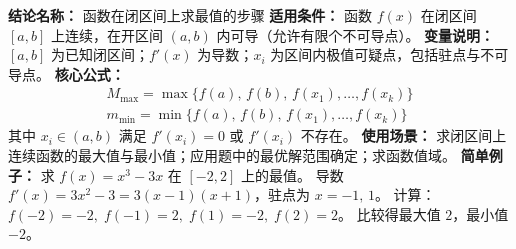 \textbf{结论名称：} 函数在闭区间上求最值的步骤  
\textbf{适用条件：} 函数 \( f(x) \) 在闭区间 \([a,b]\) 上连续，在开区间 \((a,b)\) 内可导（允许有限个不可导点）。  
\textbf{变量说明：} \( [a,b] \) 为已知闭区间；\( f'(x) \) 为导数；\( x_i \) 为区间内极值可疑点，包括驻点与不可导点。  
\textbf{核心公式：}  
\[
\boxed{
\begin{array}{l}
\displaystyle M_{\max} = \max\{f(a),\, f(b),\, f(x_1), \dots, f(x_k)\} \\[6pt]
\displaystyle m_{\min} = \min\{f(a),\, f(b),\, f(x_1), \dots, f(x_k)\}
\end{array}
}
\]  
其中 \( x_i \in (a,b) \) 满足 \( f'(x_i)=0 \) 或 \( f'(x_i) \) 不存在。  
\textbf{使用场景：} 求闭区间上连续函数的最大值与最小值；应用题中的最优解范围确定；求函数值域。  
\textbf{简单例子：} 求 \( f(x)=x^3-3x \) 在 \([-2,2]\) 上的最值。  
导数 \( f'(x)=3x^2-3=3(x-1)(x+1) \)，驻点为 \( x=-1,\,1 \)。  
计算：\( f(-2)=-2,\; f(-1)=2,\; f(1)=-2,\; f(2)=2 \)。  
比较得最大值 \( 2 \)，最小值 \( -2 \)。